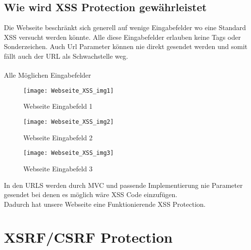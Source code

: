 {\subsection{Wie wird XSS Protection gewährleistet}
\label{sec:xss_prot}
Die Webseite beschränkt sich generell auf wenige Eingabefelder wo eine Standard XSS versucht werden könnte. Alle diese Eingabefelder erlauben keine Tags oder Sonderzeichen. Auch Url Parameter können nie direkt gesendet werden und somit fällt auch der URL als Schwachstelle weg.\\ \\Alle Möglichen Eingabefelder
\begin{figure}[H]
    \texttt{[image: Webseite\_XSS\_img1]}
    \caption{Webseite Eingabefeld 1}
    \label{fig:webxxs1}
\end{figure}
\begin{figure}[H]
    \texttt{[image: Webseite\_XSS\_img2]}
    \caption{Webseite Eingabefeld 2}
    \label{fig:webxxs1}
\end{figure}
\begin{figure}[H]
    \texttt{[image: Webseite\_XSS\_img3]}
    \caption{Webseite Eingabefeld 3}
    \label{fig:webxxs1}
\end{figure}
In den URLS werden durch MVC und passende Implementierung nie Parameter gesendet bei denen es möglich wäre XSS Code einzufügen.\\
Dadurch hat unsere Webseite eine Funktionierende XSS Protection.
\section{XSRF/CSRF Protection}
\label{sec:csrf}
}
